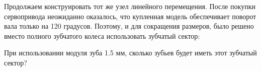 
Продолжаем конструировать тот же узел линейного перемещения.   После покупки сервопривода неожиданно оказалось, что купленная модель обеспечивает поворот вала только на 120 градусов.  Поэтому, и для сокращения размеров, было решено вместо полного зубчатого колеса использовать зубчатый сектор:


При использовании модуля зуба 1.5 мм,  сколько зубьев будет иметь этот зубчатый сектор?


